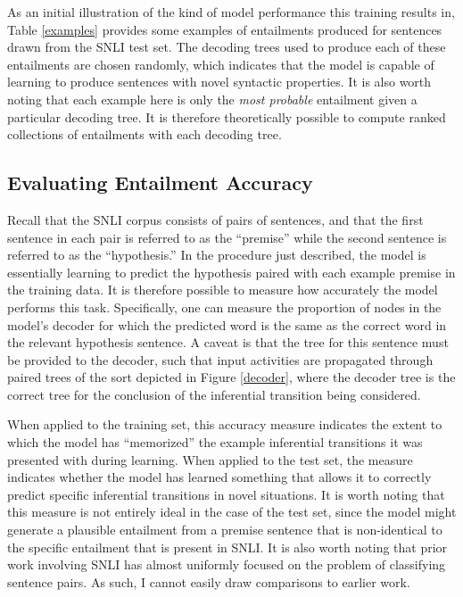 As an initial illustration of the kind of model performance this training results in, Table \ref{examples} provides some examples of entailments produced for sentences drawn from the SNLI test set. The decoding trees used to produce each of these entailments are chosen randomly, which indicates that the model is capable of learning to produce sentences with novel syntactic properties. It is also worth noting that each example here is only the \textit{most probable} entailment given a particular decoding tree. It is therefore theoretically possible to compute ranked collections of entailments with each decoding tree.  

\subsection{Evaluating Entailment Accuracy}

Recall that the SNLI corpus consists of pairs of sentences, and that the first sentence in each pair is referred to as the ``premise'' while the second sentence is referred to as the ``hypothesis.'' In the procedure just described, the model is essentially learning to predict the hypothesis paired with each example premise in the training data. It is therefore possible to measure how accurately the model performs this task. Specifically, one can measure the proportion of nodes in the model's decoder for which the predicted word is the same as the correct word in the relevant hypothesis sentence. A caveat is that the tree for this sentence must be provided to the decoder, such that input activities are propagated through paired trees of the sort depicted in Figure \ref{decoder}, where the decoder tree is the correct tree for the conclusion of the inferential transition being considered.

When applied to the training set, this accuracy measure indicates the extent to which the model has ``memorized'' the example inferential transitions it was presented with during learning. When applied to the test set, the measure indicates whether the model has learned something that allows it to correctly predict specific inferential transitions in novel situations. It is worth noting that this measure is not entirely ideal in the case of the test set, since the model might generate a plausible entailment from a premise sentence that is non-identical to the specific entailment that is present in SNLI. It is also worth noting that prior work involving SNLI has almost uniformly focused on the problem of classifying sentence pairs. As such, I cannot easily draw comparisons to earlier work.

